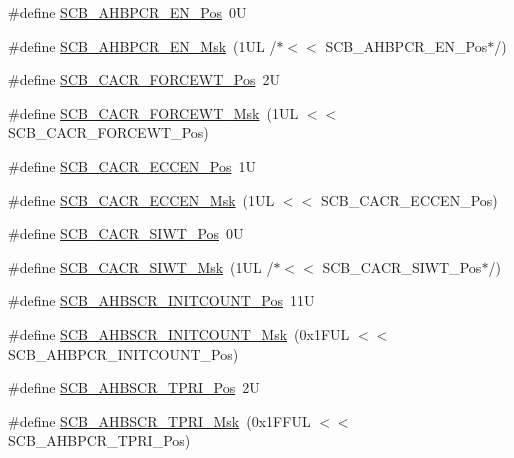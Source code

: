 \begin{DoxyCompactItemize}
\item 
\#define \hyperlink{group___c_m_s_i_s___s_c_b_ga1048eb341b71c712a1a8aedf4eedffe0}{S\+C\+B\+\_\+\+A\+H\+B\+P\+C\+R\+\_\+\+E\+N\+\_\+\+Pos}~0U
\item 
\#define \hyperlink{group___c_m_s_i_s___s_c_b_ga770da9a88e66adb62645f625b0a095cb}{S\+C\+B\+\_\+\+A\+H\+B\+P\+C\+R\+\_\+\+E\+N\+\_\+\+Msk}~(1\+U\+L /$\ast$$<$$<$ S\+C\+B\+\_\+\+A\+H\+B\+P\+C\+R\+\_\+\+E\+N\+\_\+\+Pos$\ast$/)
\item 
\#define \hyperlink{group___c_m_s_i_s___s_c_b_ga9f1abd30b202418a920255dcd1d87d5f}{S\+C\+B\+\_\+\+C\+A\+C\+R\+\_\+\+F\+O\+R\+C\+E\+W\+T\+\_\+\+Pos}~2U
\item 
\#define \hyperlink{group___c_m_s_i_s___s_c_b_ga0fd9cfb1ef8f44e3edc66fd52309fa7f}{S\+C\+B\+\_\+\+C\+A\+C\+R\+\_\+\+F\+O\+R\+C\+E\+W\+T\+\_\+\+Msk}~(1\+U\+L $<$$<$ S\+C\+B\+\_\+\+C\+A\+C\+R\+\_\+\+F\+O\+R\+C\+E\+W\+T\+\_\+\+Pos)
\item 
\#define \hyperlink{group___c_m_s_i_s___s_c_b_ga76ce5adcbed2d2d8d425214a1e5d0579}{S\+C\+B\+\_\+\+C\+A\+C\+R\+\_\+\+E\+C\+C\+E\+N\+\_\+\+Pos}~1U
\item 
\#define \hyperlink{group___c_m_s_i_s___s_c_b_ga7456a0b93710e8b9fa2b94c946e96c5c}{S\+C\+B\+\_\+\+C\+A\+C\+R\+\_\+\+E\+C\+C\+E\+N\+\_\+\+Msk}~(1\+U\+L $<$$<$ S\+C\+B\+\_\+\+C\+A\+C\+R\+\_\+\+E\+C\+C\+E\+N\+\_\+\+Pos)
\item 
\#define \hyperlink{group___c_m_s_i_s___s_c_b_gafda198ad429d0a5c865e75d42afa12a2}{S\+C\+B\+\_\+\+C\+A\+C\+R\+\_\+\+S\+I\+W\+T\+\_\+\+Pos}~0U
\item 
\#define \hyperlink{group___c_m_s_i_s___s_c_b_ga00625442f92069da7604a420bafdbd23}{S\+C\+B\+\_\+\+C\+A\+C\+R\+\_\+\+S\+I\+W\+T\+\_\+\+Msk}~(1\+U\+L /$\ast$$<$$<$ S\+C\+B\+\_\+\+C\+A\+C\+R\+\_\+\+S\+I\+W\+T\+\_\+\+Pos$\ast$/)
\item 
\#define \hyperlink{group___c_m_s_i_s___s_c_b_ga47f55c7d1b161535caff50e7a35dc734}{S\+C\+B\+\_\+\+A\+H\+B\+S\+C\+R\+\_\+\+I\+N\+I\+T\+C\+O\+U\+N\+T\+\_\+\+Pos}~11U
\item 
\#define \hyperlink{group___c_m_s_i_s___s_c_b_gabb766ac9d99ea8272387b6946e80ce43}{S\+C\+B\+\_\+\+A\+H\+B\+S\+C\+R\+\_\+\+I\+N\+I\+T\+C\+O\+U\+N\+T\+\_\+\+Msk}~(0x1\+F\+U\+L $<$$<$ S\+C\+B\+\_\+\+A\+H\+B\+P\+C\+R\+\_\+\+I\+N\+I\+T\+C\+O\+U\+N\+T\+\_\+\+Pos)
\item 
\#define \hyperlink{group___c_m_s_i_s___s_c_b_gabf98193e45e8bcb57caa28e8dc6df199}{S\+C\+B\+\_\+\+A\+H\+B\+S\+C\+R\+\_\+\+T\+P\+R\+I\+\_\+\+Pos}~2U
\item 
\#define \hyperlink{group___c_m_s_i_s___s_c_b_gab5303ca99ab56df4b6cd6298dc0e1c32}{S\+C\+B\+\_\+\+A\+H\+B\+S\+C\+R\+\_\+\+T\+P\+R\+I\+\_\+\+Msk}~(0x1\+F\+F\+U\+L $<$$<$ S\+C\+B\+\_\+\+A\+H\+B\+P\+C\+R\+\_\+\+T\+P\+R\+I\+\_\+\+Pos)

\end{DoxyCompactItemize}
